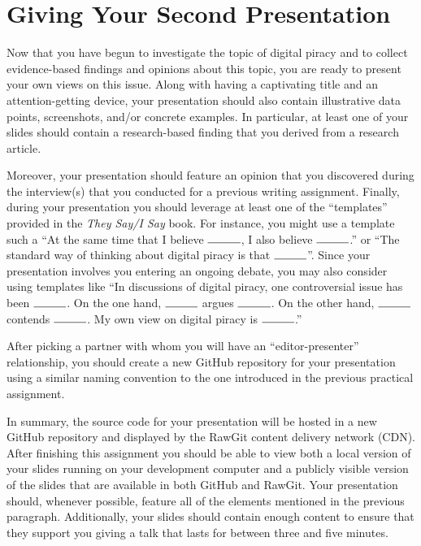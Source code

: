

\usepackage[compact]{titlesec}




\vspace*{-.2in}
\section*{Giving Your Second Presentation}

Now that you have begun to investigate the topic of digital piracy and to collect evidence-based findings and opinions
about this topic, you are ready to present your own views on this issue. Along with having a captivating title and an
attention-getting device, your presentation should also contain illustrative data points, screenshots, and/or concrete
examples. In particular, at least one of your slides should contain a research-based finding that you derived from a
research article.

Moreover, your presentation should feature an opinion that you discovered during the interview(s) that you conducted for
a previous writing assignment. Finally, during your presentation you should leverage at least one of the ``templates''
provided in the {\em They Say/I Say} book. For instance, you might use a template such a ``At the same time that I
believe $\rule{1cm}{0.15mm}$, I also believe $\rule{1cm}{0.15mm}$.'' or ``The standard way of thinking about digital
piracy is that $\rule{1cm}{0.15mm}$''. Since your presentation involves you entering an ongoing debate, you may also
consider using templates like ``In discussions of digital piracy, one controversial issue has been $\rule{1cm}{0.15mm}$.
On the one hand, $\rule{1cm}{0.15mm}$ argues $\rule{1cm}{0.15mm}$. On the other hand, $\rule{1cm}{0.15mm}$ contends
$\rule{1cm}{0.15mm}$. My own view on digital piracy is $\rule{1cm}{0.15mm}$.''

After picking a partner with whom you will have an ``editor-presenter'' relationship, you should create a new GitHub
repository for your presentation using a similar naming convention to the one introduced in the previous practical
assignment.

In summary, the source code for your presentation will be hosted in a new GitHub repository and displayed by the RawGit
content delivery network (CDN). After finishing this assignment you should be able to view both a local version of your
slides running on your development computer and a publicly visible version of the slides that are available in both
GitHub and RawGit. Your presentation should, whenever possible, feature all of the elements mentioned in the previous
paragraph. Additionally, your slides should contain enough content to ensure that they support you giving a talk that
lasts for between three and five minutes.

